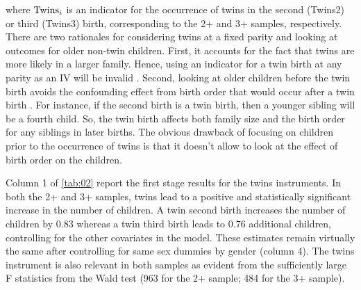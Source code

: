 where $ {\rm Twins }_{i} $ is an indicator for the occurrence of twins in the second (Twins2) or third (Twins3) birth, corresponding to the 2+ and 3+ samples, respectively. There are two rationales for considering twins at a fixed parity and looking at outcomes for older non-twin children. First, it accounts for the fact that twins are more likely in a larger family. Hence, using an indicator for a twin birth at any parity as an IV will be invalid \parencite{oberg_casual_2021}. Second, looking at older children before the twin birth avoids the confounding effect from birth order that would occur after a twin birth \parencite{Black2010}. For instance, if the second birth is a twin birth, then a younger sibling will be a fourth child. So, the twin birth affects both family size and the birth order for any siblings in later births. The obvious drawback of focusing on children prior to the occurrence of twins is that it doesn't allow to look at the effect of birth order on the children.  

Column 1 of \autoref{tab:02} report the first stage results for the twins instruments. In both the 2+ and 3+ samples, twins lead to a positive and statistically significant increase in the number of children. A twin second birth increases the number of children by 0.83 whereas a twin third birth leads to 0.76 additional children, controlling for the other covariates in the model. These estimates remain virtually the same after controlling for same sex dummies by gender (column 4).  The twins instrument is also relevant in both samples as evident from the sufficiently large F statistics from the Wald test (963 for the 2+ sample; 484 for the 3+ sample). 

